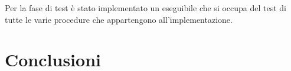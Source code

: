 \documentclass[]{IEEEtran}
\begin{document}
	
	Per la fase di test è stato implementato un eseguibile che si occupa del test di tutte le varie procedure che appartengono all'implementazione. %

\section{Conclusioni}







\end{document}

